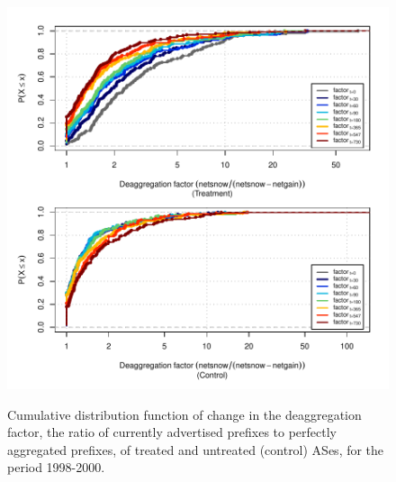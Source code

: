 \begin{figure}[H]
\begin{centering}
\begin{singlespace}
\captionsetup{list=no}
    \includegraphics[width=6in]
    {figures/behavior-deagg_factor-1998_2000-corr.pdf}
    \vspace{-2em}\\
    \caption{Cumulative distribution function of change in the deaggregation
    factor, the ratio of currently advertised prefixes to perfectly aggregated
    prefixes, of treated and untreated (control) ASes, for the period
    1998-2000.}
\end{singlespace}
\end{centering}
\end{figure}

